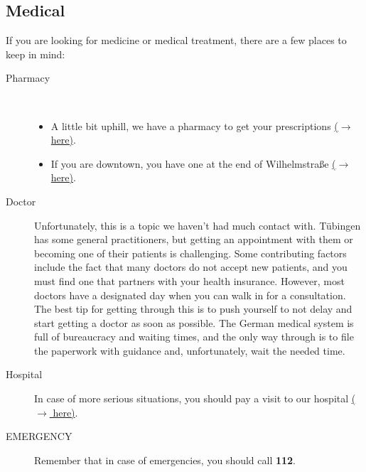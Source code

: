 \subsection{Medical}
If you are looking for medicine or medical treatment, there are a few places to keep in mind:

\begin{description}
    \item[Pharmacy] \ \
        \begin{itemize}
            \item A little bit uphill, we have a pharmacy to get your prescriptions \href{https://maps.app.goo.gl/cpDLc9VZ7XukpgS18}{($\xrightarrow{}$ here)}.
            \item If you are downtown, you have one at the end of Wilhelmstraße \href{https://maps.app.goo.gl/YXwvVpp81eTSZeJW7}{($\xrightarrow{}$ here)}.
        \end{itemize}
  
    \item[Doctor]
        Unfortunately, this is a topic we haven’t had much contact with. Tübingen has some general practitioners, but getting an appointment with them or becoming one of their patients is challenging. Some contributing factors include the fact that many doctors do not accept new patients, and you must find one that partners with your health insurance. However, most doctors have a designated day when you can walk in for a consultation. The best tip for getting through this is to push yourself to not delay and start getting a doctor as soon as possible. The German medical system is full of bureaucracy and waiting times, and the only way through is to file the paperwork with guidance and, unfortunately, wait the needed time.   
        
    \item[Hospital]
        In case of more serious situations, you should pay a visit to our hospital \href{https://maps.app.goo.gl/EHyduztd2QgxTVer9}{($\xrightarrow{}$ here)}.

    \item[EMERGENCY]
    Remember that in case of emergencies, you should call \textbf{112}.
\end{description}

